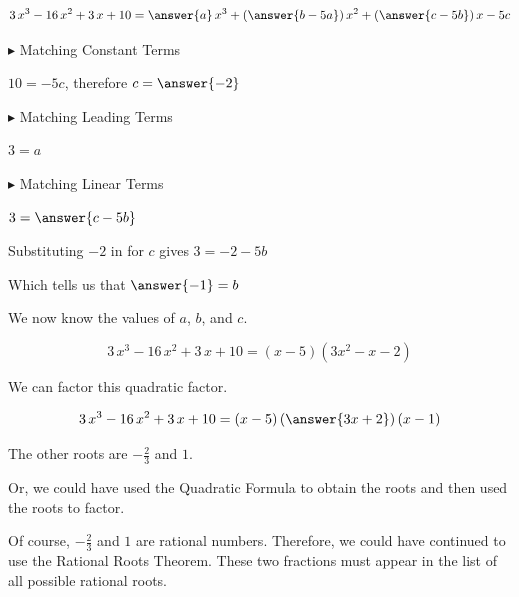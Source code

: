 \documentclass{ximera}
\begin{document}
\begin{example}
\[
3\, x^3 - 16 \, x^2 + 3 \, x + 10 = \answer{a} \, x^3 + \left( \answer{b-5a} \right) x^2 + \left( \answer{c-5b} \right) x - 5c
\]



$\blacktriangleright$ Matching Constant Terms 


$10 = -5c$, therefore $c = \answer{-2}$ 



$\blacktriangleright$ Matching Leading Terms 


$3 = a$ 



$\blacktriangleright$ Matching Linear Terms 

$3 = \answer{c-5b}$ 

Substituting $-2$ in for $c$ gives $3 = -2 - 5b$ 

Which tells us that $\answer{-1} = b$ 



We now know the values of $a$, $b$, and $c$.


\[
3\, x^3 - 16 \, x^2 + 3 \, x + 10  = (x - 5) (3 x^2 -  x - 2) 
\]


We can factor this quadratic factor.

\[
3\, x^3 - 16 \, x^2 + 3 \, x + 10  = (x - 5) \left(\answer{3x + 2} \right) (x - 1) 
\]


The other roots are $-\frac{2}{3}$ and $1$. 


Or, we could have used the Quadratic Formula to obtain the roots and then used the roots to factor. 


Of course, $-\frac{2}{3}$ and $1$ are rational numbers.  Therefore, we could have continued to use the Rational Roots Theorem.  These two fractions must appear in the list of all possible rational roots.








\end{example}
\end{document}
